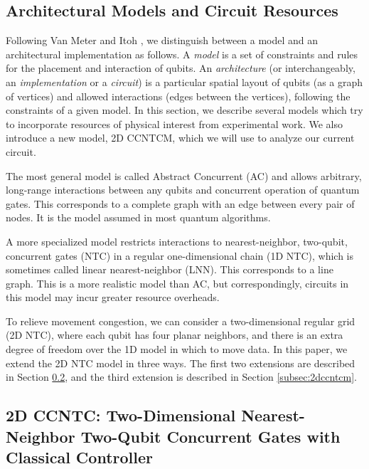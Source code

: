 \documentclass[twoside]{article}
\begin{document}
\subsection{Architectural Models and Circuit Resources}
\label{subsec:models}

Following Van Meter and Itoh \cite{VanMeter2005},
we distinguish between a model and an architectural implementation as follows.
A \emph{model} is a set of constraints and rules for the placement and
interaction of qubits.
An \emph{architecture} (or interchangeably, an \emph{implementation} 
or a \emph{circuit}) is a particular
spatial layout of qubits (as a graph of vertices) and allowed interactions (edges between the vertices),
following the constraints of a given model. In this section, we describe
several models which try to incorporate resources of physical interest from
experimental work. We also introduce a new model,
\textsc{2D CCNTCM}, which we will use to analyze our current circuit.

The most general model is called Abstract Concurrent (\textsc{AC})
and allows arbitrary, long-range interactions between any qubits and concurrent
operation of quantum gates.
This corresponds to a complete graph with an edge between every pair of nodes.
It is the model assumed in most quantum algorithms.

A more specialized model restricts interactions to nearest-neighbor, two-qubit,
concurrent gates (\textsc{NTC}) in a regular one-dimensional chain (1D NTC),
which is sometimes called linear nearest-neighbor (\textsc{LNN}).
This corresponds to a line graph. This is a more realistic model than
\textsc{AC}, but correspondingly, circuits in this model may incur greater
resource overheads.

To relieve movement congestion,
we can consider a two-dimensional regular grid
(2D NTC), where each
qubit has four planar neighbors, and 
there is an extra degree of freedom over the 1D model
in which to move data.
In this paper, we extend the \textsc{2D NTC} model in three ways.
The first two extensions are described in Section \ref{subsec:2dccntc},
and the third extension is described in Section \ref{subsec:2dccntcm}.

\subsection{\textsc{2D CCNTC}: Two-Dimensional Nearest-Neighbor Two-Qubit Concurrent Gates with Classical Controller}
\label{subsec:2dccntc}
\end{document}
